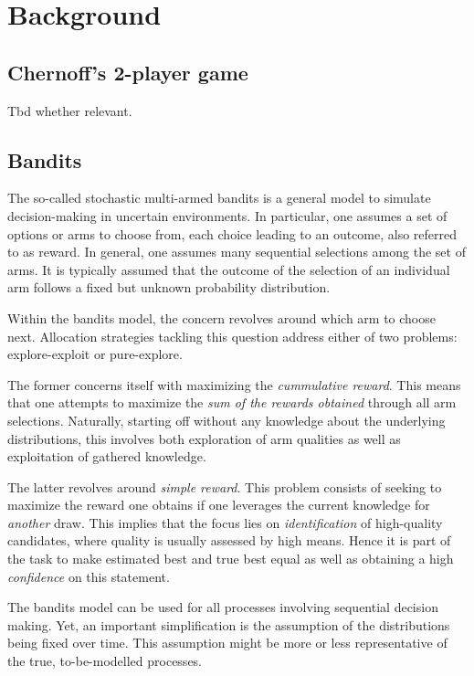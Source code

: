 \chapter{Background}

\section{Chernoff's 2-player game}
Tbd whether relevant.

\section{Bandits}
The so-called stochastic multi-armed bandits is a general model to simulate decision-making in uncertain environments.
In particular, one assumes a set of options or arms to choose from, each choice leading to an outcome, also referred to as reward. In general, one assumes many sequential selections among the set of arms. It is typically assumed that the outcome of the selection of an individual arm follows a fixed but unknown probability distribution.

Within the bandits model, the concern revolves around which arm to choose next. Allocation strategies tackling this question address either of two problems: explore-exploit or pure-explore.

The former concerns itself with maximizing the \emph{cummulative reward}. This means that one attempts to maximize the \emph{sum of the rewards obtained} through all arm selections. Naturally, starting off without any knowledge about the underlying distributions, this involves both exploration of arm qualities as well as exploitation of gathered knowledge.

The latter revolves around \emph{simple reward}. This problem consists of seeking to maximize the reward one obtains if one leverages the current knowledge for \emph{another} draw. This implies that the focus lies on \emph{identification} of high-quality candidates, where quality is usually assessed by high means. Hence it is part of the task to make estimated best and true best equal as well as obtaining a high \emph{confidence} on this statement.

The bandits model can be used for all processes involving sequential decision making. Yet, an important simplification is the assumption of the distributions being fixed over time. This assumption might be more or less representative of the true, to-be-modelled processes.

